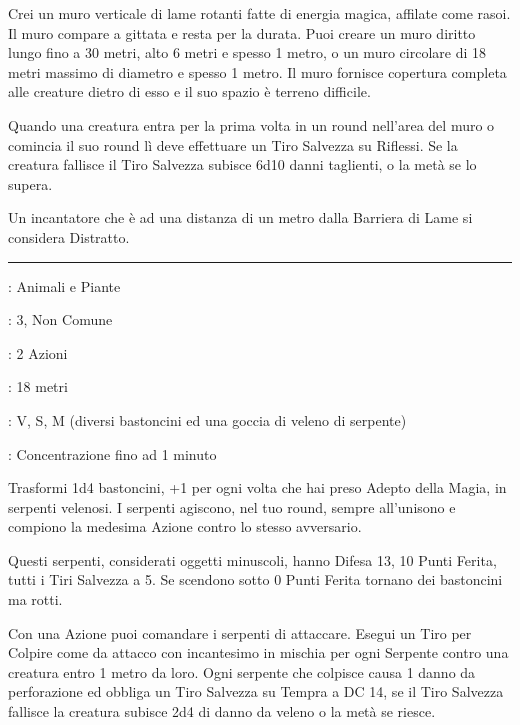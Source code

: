 \begin{multicols}{2}
Crei un muro verticale di lame rotanti fatte di energia magica, affilate come rasoi. Il muro compare a gittata e resta per la durata. Puoi creare un muro diritto lungo fino a 30 metri, alto 6 metri e spesso 1 metro, o un muro circolare di 18 metri massimo di diametro e spesso 1 metro. Il muro fornisce copertura completa alle creature dietro di esso e il suo spazio è terreno difficile.

Quando una creatura entra per la prima volta in un round nell'area del muro o comincia il suo round lì deve effettuare un Tiro Salvezza su Riflessi. Se la creatura fallisce il Tiro Salvezza subisce 6d10 danni taglienti, o la metà se lo supera.

Un incantatore che è ad una distanza di un metro dalla Barriera di Lame si considera Distratto.

\smallskip\noindent\rule{\linewidth}{2pt} \hypertarget{Bastoni in Serpenti}{}\smallskip{}
\noindent
\begin{description}[noitemsep, topsep=0pt, parsep=0pt, partopsep=0pt, leftmargin=0cm, labelwidth=2.8cm]
	\item[\textbf{Lista di Magia}]: Animali e Piante
	\item[\textbf{Livello}]: 3, Non Comune
	\item[\textbf{T. di Lancio}]: 2 Azioni
	\item[\textbf{Gittata}]: 18 metri
	\item[\textbf{Componenti}]: V, S, M (diversi bastoncini ed una goccia di veleno di serpente)
	\item[\textbf{Durata}]: Concentrazione fino ad 1 minuto
\end{description}

Trasformi 1d4 bastoncini, +1 per ogni volta che hai preso Adepto della Magia, in serpenti velenosi. I serpenti agiscono, nel tuo round, sempre all'unisono e compiono la medesima Azione contro lo stesso avversario.

Questi serpenti, considerati oggetti minuscoli, hanno Difesa 13, 10 Punti Ferita, tutti i Tiri Salvezza a 5. Se scendono sotto 0 Punti Ferita tornano dei bastoncini ma rotti.

Con una Azione puoi comandare i serpenti di attaccare. Esegui un Tiro per Colpire come da attacco con incantesimo in mischia per ogni Serpente contro una creatura entro 1 metro da loro. Ogni serpente che colpisce causa 1 danno da perforazione ed obbliga un Tiro Salvezza su Tempra a DC 14, se il Tiro Salvezza fallisce la creatura subisce 2d4 di danno da veleno o la metà se riesce.


\end{multicols}
